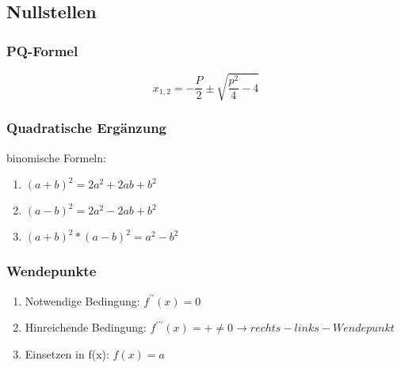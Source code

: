 	\subsection{Nullstellen}
		\subsubsection{PQ-Formel}
			$$
x_{1, 2} = - \frac{P}{2} \pm \sqrt{\frac{p^{2}}{4}-4}
			$$
		\subsubsection{Quadratische Ergänzung}
			binomische Formeln:
				\begin{enumerate}
					\item $(a+b)^{2} = 2a^{2}+2ab+b^{2}$
					\item $(a-b)^{2} = 2a^{2}-2ab+b^{2}$
					\item $(a+b)^{2}*(a-b)^{2}  = a^{2}-b^{2}$
				\end{enumerate}
		\subsubsection{Wendepunkte}
			\begin{enumerate}
				\item Notwendige Bedingung: $f^{\prime\prime}(x)=0$
				\item Hinreichende Bedingung: $f^{\prime\prime\prime}(x)=+\neq0 \rightarrow rechts-links-Wendepunkt$
				\item Einsetzen in f(x): $f(x)=a$
			\end{enumerate}